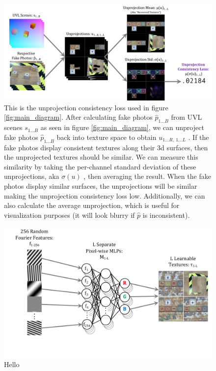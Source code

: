 \documentclass{article}
\begin{document}
\begin{figure}[H]
	\begin{center}
		\includegraphics[width=400pt]{../images/unprojection_consistency_loss.pdf}
	\end{center}
	\caption{
		This is the unprojection consistency loss used in figure \ref{fig:main_diagram}.
		After calculating fake photos $\hat{p}_{1...B}$ from UVL scenes $s_{1...B}$ as seen in figure \ref{fig:main_diagram}, 
		we can unproject fake photos $\hat{p}_{1...B}$ back into texture space to obtain $u_{1...R,\ 1...L}$ .
		If the fake photos display consistent textures along their 3d surfaces, then the unprojected textures should be similar.
		We can measure this similarity by taking the per-channel standard deviation of these unprojections, aka $\sigma(u)$ , then averaging the result.
		When the fake photos display similar surfaces, the unprojections will be similar making the unprojection consistency loss low.
		Additionally, we can also calculate the average unprojection, which is useful for visualization purposes (it will look blurry if $\hat{p}$ is inconsistent).
	}
	\label{fig:unprojection_consistency_loss}
\end{figure}

\begin{figure}[H]
	\begin{center}
		\includegraphics[width=400pt]{../images/learnable_textures.pdf}
	\end{center}
	\caption{
		Hello
	}
	\label{fig:unprojection_consistency_loss}
\end{figure}
\end{document}
